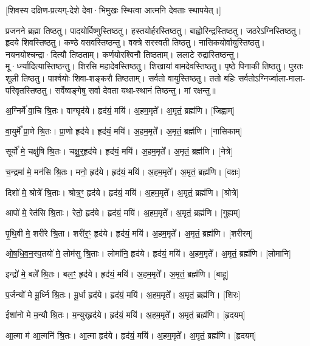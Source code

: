 [शिवस्य दक्षिण-प्रत्यग्-देशे देवा·भिमुखः स्थित्वा आत्मनि देवताः स्थापयेत्।]

प्रजनने ब्रह्मा तिष्ठतु। पादयो\dot{}र्विष्णु\dot{}स्तिष्ठतु। हस्तयो\dot{}र्हर\dot{}स्तिष्ठतु। बाह्वो\dot{}रिन्द्र\dot{}स्तिष्ठतु। जठरेऽग्नि\dot{}स्तिष्ठतु। हृदये शिव\dot{}स्तिष्ठतु। कण्ठे वसव\dot{}स्तिष्ठन्तु। वक्त्रे सरस्वती तिष्ठतु। नासिकयो\dot{}र्वायु\dot{}स्तिष्ठतु। नयनयो\dot{}श्चन्द्रा·दित्यौ तिष्ठताम्। कर्णयो\dot{}रश्विनौ तिष्ठताम्। ललाटे रुद्रा\dot{}स्तिष्ठन्तु। मू·र्ध्न्यादित्या\dot{}स्तिष्ठन्तु। शिरसि महादेव\dot{}स्तिष्ठतु। शिखायां वामदेव\dot{}स्तिष्ठतु। पृष्ठे पिनाकी तिष्ठतु। पुरतः शूली तिष्ठतु। पार्श्वयोः शिवा-शङ्करौ तिष्ठताम्। सर्वतो वायु\dot{}स्तिष्ठतु। ततो बहिः सर्वतोऽग्नि\dot{}र्ज्वाला-माला-परिवृत\dot{}स्तिष्ठतु। सर्वे\dot{}ष्वङ्गेषु सर्वा देवता यथा-स्थानं तिष्ठन्तु। मां रक्षन्तु॥


अ॒ग्निर्मे॑ वा॒चि श्रि॒तः। वाग्घृद॑ये। हृद॑यं॒ मयि॑। अ॒हम॒मृते᳚। अ॒मृतं॒ ब्रह्म॑णि। [जिह्वाम्]

वा॒युर्मे᳚ प्रा॒णे श्रि॒तः। प्रा॒णो हृद॑ये। हृद॑यं॒ मयि॑। अ॒हम॒मृते᳚। अ॒मृतं॒ ब्रह्म॑णि। [नासिकाम्]

सूर्यो॑ मे॒ चक्षु॑षि श्रि॒तः। चक्षु॒र्‌॒हृद॑ये। हृद॑यं॒ मयि॑। अ॒हम॒मृते᳚। अ॒मृतं॒ ब्रह्म॑णि। [नेत्रे]

च॒न्द्रमा॑ मे॒ मन॑सि श्रि॒तः। मनो॒ हृद॑ये। हृद॑यं॒ मयि॑। अ॒हम॒मृते᳚। अ॒मृतं॒ ब्रह्म॑णि। [वक्षः]

दिशो॑ मे॒ श्रोत्रे᳚ श्रि॒ताः। श्रोत्र॒ꣳ॒ हृद॑ये। हृद॑यं॒ मयि॑। अ॒हम॒मृते᳚। अ॒मृतं॒ ब्रह्म॑णि। [श्रोत्रे]

आपो॑ मे॒ रेत॑सि श्रि॒ताः। रेतो॒ हृद॑ये। हृद॑यं॒ मयि॑। अ॒हम॒मृते᳚। अ॒मृतं॒ ब्रह्म॑णि। [गुह्यम्]

पृ॒थि॒वी मे॒ शरी॑रे श्रि॒ता। शरी॑र॒ꣳ॒ हृद॑ये। हृद॑यं॒ मयि॑। अ॒हम॒मृते᳚। अ॒मृतं॒ ब्रह्म॑णि। [शरीरम्]

ओ॒ष॒धि॒व॒न॒स्प॒तयो॑ मे॒ लोम॑सु श्रि॒ताः। लोमा॑नि॒ हृद॑ये। हृद॑यं॒ मयि॑। अ॒हम॒मृते᳚। अ॒मृतं॒ ब्रह्म॑णि। [लोमानि]

इन्द्रो॑ मे॒ बले᳚ श्रि॒तः। बल॒ꣳ॒ हृद॑ये। हृद॑यं॒ मयि॑। अ॒हम॒मृते᳚। अ॒मृतं॒ ब्रह्म॑णि। [बाहू]

प॒र्जन्यो॑ मे मू॒र्ध्नि श्रि॒तः। मू॒र्धा हृद॑ये। हृद॑यं॒ मयि॑। अ॒हम॒मृते᳚। अ॒मृतं॒ ब्रह्म॑णि। [शिरः]

ईशा॑नो मे म॒न्यौ श्रि॒तः। म॒न्युर्‌हृद॑ये। हृद॑यं॒ मयि॑। अ॒हम॒मृते᳚। अ॒मृतं॒ ब्रह्म॑णि। [हृदयम्]

आ॒त्मा म॑ आ॒त्मनि॑ श्रि॒तः। आ॒त्मा हृद॑ये। हृद॑यं॒ मयि॑। अ॒हम॒मृते᳚। अ॒मृतं॒ ब्रह्म॑णि। [हृदयम्]

